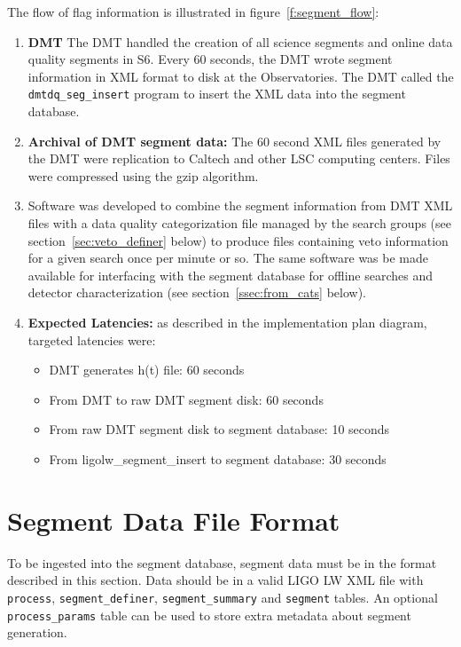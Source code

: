 The flow of flag information is illustrated in
figure~\ref{f:segment_flow}:
%
\begin{enumerate}
\item \textbf{DMT} The DMT handled
the creation of all science segments and online data quality segments
in S6. Every 60 seconds, the DMT wrote segment
information in XML format to disk at the Observatories. The DMT called
the \texttt{dmtdq\_seg\_insert} program to insert the XML data into
the segment database.

\item \textbf{Archival of DMT segment data:} The 60 second XML files
generated by the DMT were replication to Caltech and other LSC
computing centers. Files were compressed using the gzip algorithm.

\item Software was developed to combine the segment
information from DMT XML files with a data quality categorization file
managed by the search groups (see section~\ref{sec:veto_definer}
below) to produce files containing veto information for a given search
once per minute or so.  The same software was be made available for
interfacing with the segment database for offline searches and
detector characterization (see section~\ref{ssec:from_cats}
below).

\item \textbf{Expected Latencies:} as described in the implementation plan
diagram, targeted latencies were:
\begin{itemize}
\item DMT generates h(t) file: 60 seconds
\item From DMT to raw DMT segment disk: 60 seconds
\item From raw DMT segment disk to segment database: 10 seconds
\item From ligolw\_segment\_insert to segment database: 30 seconds
\end{itemize}
\end{enumerate}



\section{Segment Data File Format}
\label{sec:data_file_format}

To be ingested into the segment database, segment data must be in the
format described in this section. Data should be in a valid LIGO LW
XML file with \verb|process|, \verb|segment_definer|,
\verb|segment_summary| and \verb|segment| tables. An optional
\verb|process_params| table can be used to store extra metadata about
segment generation.


